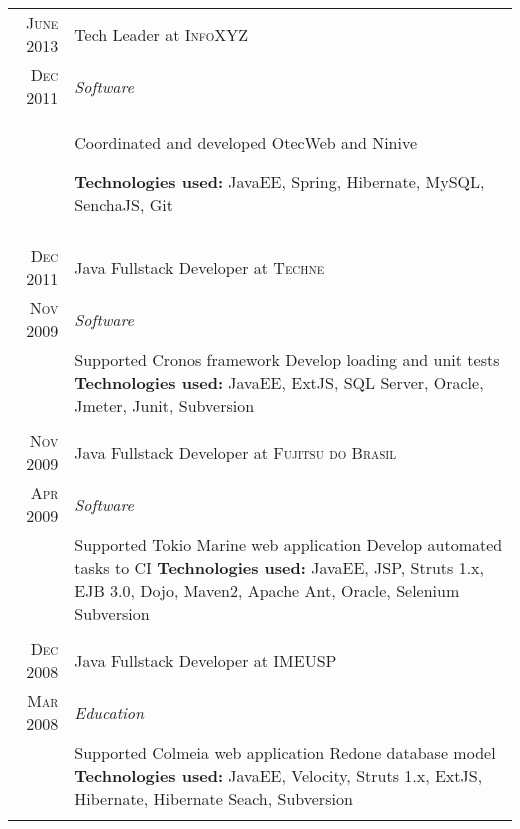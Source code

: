 \documentclass[a4paper,10pt]{article}
\begin{document}
 \newpage
\begin{tabular}{r|p{11cm}}

\textsc{June 2013} & Tech Leader at \textsc{InfoXYZ} \\\textsc{Dec 2011}&\emph{Software}\\&\footnotesize{  Coordinated and developed OtecWeb and Ninive\newline

\textbf{Technologies used:} JavaEE, Spring, Hibernate, MySQL, SenchaJS, Git
 }\\\multicolumn{2}{c}{} \\

\textsc{Dec 2011} & Java Fullstack Developer at \textsc{Techne} \\\textsc{Nov 2009}&\emph{Software}\\&\footnotesize{  Supported Cronos framework\newline
                          Develop loading and unit tests \newline
\textbf{Technologies used:} JavaEE, ExtJS, SQL Server, Oracle, Jmeter, Junit, Subversion
 }\\\multicolumn{2}{c}{} \\

\textsc{Nov 2009} & Java Fullstack Developer at \textsc{Fujitsu do Brasil}\\
\textsc{Apr 2009}&\emph{Software}\\&\footnotesize{  Supported Tokio Marine web application\newline
                          Develop automated tasks to CI \newline
\textbf{Technologies used:} JavaEE, JSP, Struts 1.x, EJB 3.0, Dojo, Maven2, Apache Ant, Oracle, Selenium Subversion
 }\\\multicolumn{2}{c}{} \\ 
 \textsc{Dec 2008} & Java Fullstack Developer at \textsc{IMEUSP} \\\textsc{Mar 2008} &\emph{Education}\\&\footnotesize{ Supported Colmeia web application\newline
                          Redone database model\newline
\textbf{Technologies used:} JavaEE, Velocity, Struts 1.x, ExtJS, Hibernate, Hibernate Seach, Subversion
 }\\\multicolumn{2}{c}{} \\
 

\end{tabular}
\end{document}

